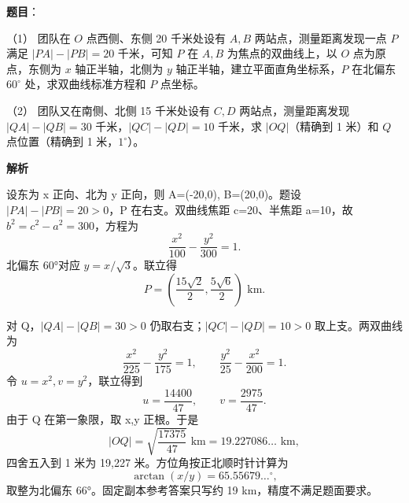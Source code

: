 \begin{answer}

\textbf{题目}：

（1） 团队在 $O$ 点西侧、东侧 20 千米处设有 $A,B$ 两站点，测量距离发现一点 $P$ 满足 $|PA|-|PB|=20$ 千米，可知 $P$ 在 $A,B$ 为焦点的双曲线上，以 $O$ 点为原点，东侧为 $x$ 轴正半轴，北侧为 $y$ 轴正半轴，建立平面直角坐标系，$P$ 在北偏东 $60^\circ$ 处，求双曲线标准方程和 $P$ 点坐标。

（2） 团队又在南侧、北侧 15 千米处设有 $C,D$ 两站点，测量距离发现 $|QA|-|QB|=30$ 千米，$|QC|-|QD|=10$ 千米，求 $|OQ|$（精确到 1 米）和 $Q$ 点位置（精确到 1 米，$1^\circ$）。

\textbf{解析}


设东为 x 正向、北为 y 正向，则 A=(-20,0), B=(20,0)。题设 \(|PA|-|PB|=20>0\)，P 在右支。双曲线焦距 c=20、半焦距 a=10，故 \(b^2=c^2-a^2=300\)，方程为
\nopagebreak[4]
\[
\frac{x^2}{100}-\frac{y^2}{300}=1.
\]
北偏东 60°对应 \(y=x/\sqrt3\)。联立得
\nopagebreak[4]
\[
P=\left(\frac{15\sqrt2}{2},\frac{5\sqrt6}{2}\right)\text{ km}.
\]


对 Q，\(|QA|-|QB|=30>0\) 仍取右支；\(|QC|-|QD|=10>0\) 取上支。两双曲线为
\nopagebreak[4]
\[
\frac{x^2}{225}-\frac{y^2}{175}=1,\qquad
\frac{y^2}{25}-\frac{x^2}{200}=1.
\]
令 \(u=x^2,v=y^2\)，联立得到
\nopagebreak[4]
\[
u=\frac{14400}{47},\qquad v=\frac{2975}{47}.
\]
由于 Q 在第一象限，取 x,y 正根。于是
\nopagebreak[4]
\[
|OQ|=\sqrt{\frac{17375}{47}}\text{ km}
=19.227086\ldots\text{ km},
\]
四舍五入到 1 米为 19,227 米。方位角按正北顺时针计算为
\nopagebreak[4]
\[
\arctan(x/y)=65.55679\ldots^\circ,
\]
取整为北偏东 66°。固定副本参考答案只写约 19 km，精度不满足题面要求。



\end{answer}
